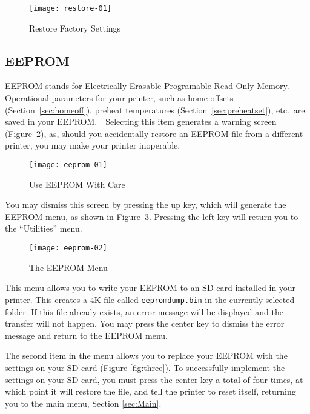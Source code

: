 \begin{figure}[!htbp]
  \centering
    \texttt{[image: restore-01]}
    \caption{Restore Factory Settings}
  \label{fig:restore}
\end{figure}


\subsection{EEPROM} \label{sec:eeprom}

\gls{EEPROM} stands for Electrically Erasable Programable Read-Only Memory.  Operational parameters for your printer, such as home offsets (Section~\ref{sec:homeoff}), preheat temperatures (Section~\ref{sec:preheatset}), etc.\ are saved in your EEPROM.\ \ Selecting this item generates a warning screen (Figure~\ref{fig:EEPROMwarning}), as, should you accidentally restore an EEPROM file from a different printer, you may make your printer inoperable.

\begin{figure}[!htbp]
  \centering
    \texttt{[image: eeprom-01]}
    \caption{Use EEPROM With Care}
  \label{fig:EEPROMwarning}
\end{figure}

You may dismiss this screen by pressing the up key, which will generate the EEPROM menu, as shown in Figure~\ref{fig:eeprom}.  Pressing the left key will return you to the ``Utilities'' menu.

\begin{figure}[!htbp]
  \centering
    \texttt{[image: eeprom-02]}
    \caption{The EEPROM Menu}
  \label{fig:eeprom}
\end{figure}

This menu allows you to write your EEPROM to an SD card installed in your printer.  This creates a 4K file called \texttt{eeprom\textunderscore dump.bin} in the currently selected folder.  If this file already exists, an error message will be displayed and the transfer will not happen.  You may press the center key to dismiss the error message and return to the EEPROM menu.

The second item in the menu allows you to replace your EEPROM with the settings on your SD card (Figure \ref{fig:three}).  To successfully implement the settings on your SD card, you must press the center key a total of four times, at which point it will restore the file, and tell the printer to reset itself, returning you to the main menu, Section \ref{sec:Main}.

